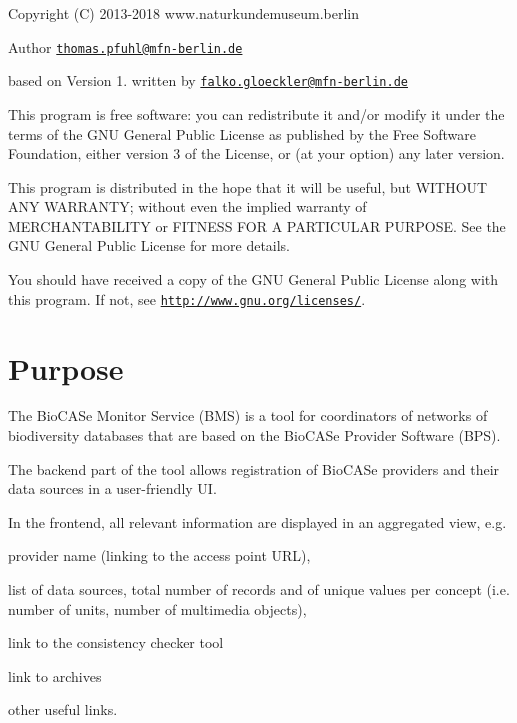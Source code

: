\begin{DoxyCopyright}{Copyright}
(C) 2013-\/2018 www.\+naturkundemuseum.\+berlin
\end{DoxyCopyright}
\begin{DoxyAuthor}{Author}
\href{mailto:thomas.pfuhl@mfn-berlin.de}{\tt thomas.\+pfuhl@mfn-\/berlin.\+de}
\end{DoxyAuthor}
based on Version 1. written by \href{mailto:falko.gloeckler@mfn-berlin.de}{\tt falko.\+gloeckler@mfn-\/berlin.\+de}

This program is free software\+: you can redistribute it and/or modify it under the terms of the G\+NU General Public License as published by the Free Software Foundation, either version 3 of the License, or (at your option) any later version.

This program is distributed in the hope that it will be useful, but W\+I\+T\+H\+O\+UT A\+NY W\+A\+R\+R\+A\+N\+TY; without even the implied warranty of M\+E\+R\+C\+H\+A\+N\+T\+A\+B\+I\+L\+I\+TY or F\+I\+T\+N\+E\+SS F\+OR A P\+A\+R\+T\+I\+C\+U\+L\+AR P\+U\+R\+P\+O\+SE. See the G\+NU General Public License for more details.

You should have received a copy of the G\+NU General Public License along with this program. If not, see \href{http://www.gnu.org/licenses/}{\tt http\+://www.\+gnu.\+org/licenses/}.





\section*{Purpose}

The Bio\+C\+A\+Se Monitor Service (B\+MS) is a tool for coordinators of networks of biodiversity databases that are based on the Bio\+C\+A\+Se Provider Software (B\+PS).

The backend part of the tool allows registration of Bio\+C\+A\+Se providers and their data sources in a user-\/friendly UI.

In the frontend, all relevant information are displayed in an aggregated view, e.\+g.
\begin{DoxyItemize}
\item provider name (linking to the access point U\+RL),
\item list of data sources, total number of records and of unique values per concept (i.\+e. number of units, number of multimedia objects),
\item link to the consistency checker tool
\item link to archives
\item other useful links.
\end{DoxyItemize}

